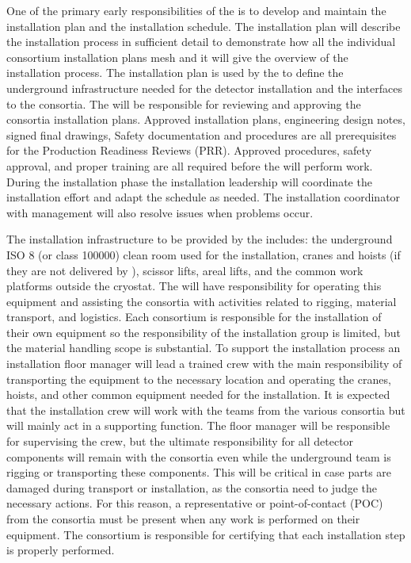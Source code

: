 One of the primary early responsibilities of the  is to
develop and maintain the  installation plan and the
installation schedule. The  installation plan will
describe the installation process in sufficient detail to demonstrate
how all the individual consortium installation plans mesh and it will
give the overview of the installation process. The installation plan
is used by the  to define the underground infrastructure
needed for the detector installation and the interfaces to the
consortia. The  will be responsible for reviewing and
approving the consortia installation plans. Approved installation
plans, engineering design notes, signed final drawings, Safety
documentation and procedures are all prerequisites for the Production
Readiness Reviews (PRR). Approved procedures, safety approval, and
proper training are all required before the  will perform
work. During the installation phase the installation leadership will
coordinate the  installation effort and adapt the schedule
as needed. The installation coordinator with management will also
resolve issues when problems occur.

The installation infrastructure to be provided by the 
includes: the underground ISO 8 (or class \num{100000}) clean room
used for the installation, cranes and hoists (if they are not
delivered by ), scissor lifts, areal lifts, and the common
work platforms outside the cryostat. The  will have
responsibility for operating this equipment and assisting the
consortia with activities related to rigging, material transport, and
logistics. Each consortium is responsible for the installation of
their own equipment so the responsibility of the installation group is
limited, but the material handling scope is substantial. To support
the installation process an installation floor manager will lead a
trained crew with the main responsibility of transporting the
equipment to the necessary location and operating the cranes, hoists,
and other common equipment needed for the installation. It is expected
that the installation crew will work with the teams from the various
consortia but will mainly act in a supporting function. The
 floor manager will be responsible for supervising the
 crew, but the ultimate responsibility for all detector
components will remain with the consortia even while the underground
team is rigging or transporting these components.  This will be
critical in case parts are damaged during transport or installation,
as the consortia need to judge the necessary actions. For this reason,
a representative or point-of-contact (POC) from the consortia must be
present when any work is performed on their equipment. The consortium
is responsible for certifying that each installation step is properly
performed.

